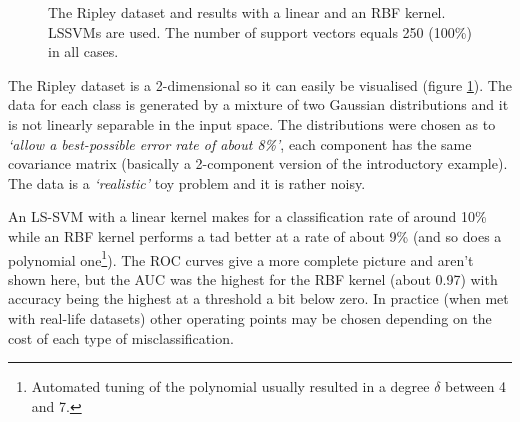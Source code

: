 \begin{figure}[htp]
\centering
{}\hfil
{}\hfil
{}\hfil
\caption{The Ripley dataset and results with a linear and an RBF kernel. LSSVMs are used. The number of support vectors equals 250 (100\%) in all cases.}
\label{ripley}
\end{figure}

The Ripley dataset is a 2-dimensional so it can easily be visualised (figure \ref{ripley}). The data for each class is generated by a mixture of two Gaussian distributions and it is not linearly separable in the input space. The distributions were chosen as to \textit{`allow a best-possible error rate of about 8\%'}, each component has the same covariance matrix (basically a 2-component version of the introductory example). The data is a \textit{`realistic'} toy problem and it is rather noisy.

\par An LS-SVM with a linear kernel makes for a classification rate of around 10\% while an RBF kernel performs a tad better at a rate of about 9\% (and so does a polynomial one\footnote{Automated tuning of the polynomial usually resulted in a degree $\delta$ between 4 and 7.}). The ROC curves give a more complete picture and aren't shown here, but the AUC was the highest for the RBF kernel (about 0.97) with accuracy being the highest at a threshold a bit below zero. In practice (when met with real-life datasets) other operating points may be chosen depending on the cost of each type of misclassification.

